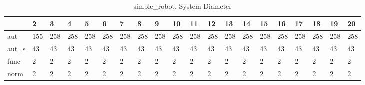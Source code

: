 \begin{table}
\centering
\caption{simple_robot, System Diameter}
\label{simple_robot_diam}
\begin{tabular}{llllllllllllllllllll}
\toprule
{} &    2 &    3 &    4 &    5 &    6 &    7 &    8 &    9 &   10 &   11 &   12 &   13 &   14 &   15 &   16 &   17 &   18 &   19 &   20 \\
\midrule
aut   &  155 &  258 &  258 &  258 &  258 &  258 &  258 &  258 &  258 &  258 &  258 &  258 &  258 &  258 &  258 &  258 &  258 &  258 &  258 \\
aut\_s &   43 &   43 &   43 &   43 &   43 &   43 &   43 &   43 &   43 &   43 &   43 &   43 &   43 &   43 &   43 &   43 &   43 &   43 &   43 \\
func  &    2 &    2 &    2 &    2 &    2 &    2 &    2 &    2 &    2 &    2 &    2 &    2 &    2 &    2 &    2 &    2 &    2 &    2 &    2 \\
norm  &    2 &    2 &    2 &    2 &    2 &    2 &    2 &    2 &    2 &    2 &    2 &    2 &    2 &    2 &    2 &    2 &    2 &    2 &    2 \\
\bottomrule
\end{tabular}
\end{table}
